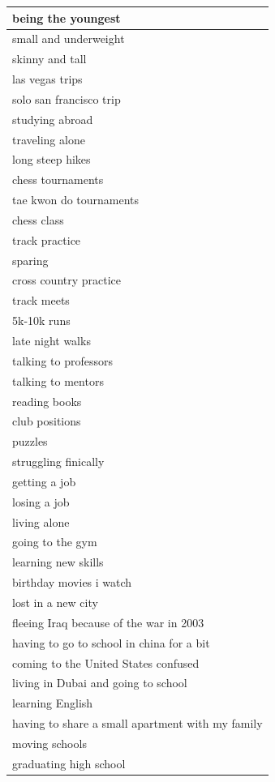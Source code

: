 \documentclass[
  .7em,
  letterpaper,
  DIV=11,
  numbers=noendperiod]{scrartcl}
\begin{document}
\begin{table}
\begin{tabular}{l}
\hline
being the youngest\\
\hline
small and underweight\\
\hline
skinny and tall\\
\hline
las vegas trips\\
\hline
solo san francisco trip\\
\hline
studying abroad\\
\hline
traveling alone\\
\hline
long steep hikes\\
\hline
chess tournaments\\
\hline
tae kwon do tournaments\\
\hline
chess class\\
\hline
track practice\\
\hline
sparing\\
\hline
cross country practice\\
\hline
track meets\\
\hline
5k-10k runs\\
\hline
late night walks\\
\hline
talking to professors\\
\hline
talking to mentors\\
\hline
reading books\\
\hline
club positions\\
\hline
puzzles\\
\hline
struggling finically\\
\hline
getting a job\\
\hline
losing a job\\
\hline
living alone\\
\hline
going to the gym\\
\hline
learning new skills\\
\hline
birthday movies i watch\\
\hline
lost in a new city\\
\hline
fleeing Iraq because of the war in 2003\\
\hline
having to go to school in china for a bit\\
\hline
coming to the United States confused\\
\hline
living in Dubai and going to school\\
\hline
learning English\\
\hline
having to share a small apartment with my family\\
\hline
moving schools\\
\hline
graduating high school\\

\end{tabular}
\end{table}
\end{document}
